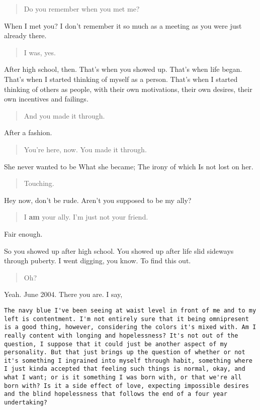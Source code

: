 \begin{quote}
Do you remember when you met me?
\end{quote}

When I met you? I don't remember it so much as a meeting as you were just already there.

\begin{quote}
I was, yes.
\end{quote}

After high school, then. That's when you showed up. That's when life began. That's when I started thinking of myself as a person. That's when I started thinking of others as people, with their own motivations, their own desires, their own incentives and failings.

\begin{quote}
And you made it through.
\end{quote}

After a fashion.

\begin{quote}
You're here, now. You made it through.
\end{quote}

She never wanted to be What she became; The irony of which Is not lost on her.

\begin{quote}
Touching.
\end{quote}

Hey now, don't be rude. Aren't you supposed to be my ally?

\begin{quote}
I \textbf{am} your ally. I'm just not your friend.
\end{quote}

Fair enough.

So you showed up after high school. You showed up after life slid sideways through puberty. I went digging, you know. To find this out.

\begin{quote}
Oh?
\end{quote}

Yeah. June 2004. There you are. I say,

\begin{verbatim}
The navy blue I've been seeing at waist level in front of me and to my left is contentment. I'm not entirely sure that it being omnipresent is a good thing, however, considering the colors it's mixed with. Am I really content with longing and hopelessness? It's not out of the question, I suppose that it could just be another aspect of my personality. But that just brings up the question of whether or not it's something I ingrained into myself through habit, something where I just kinda accepted that feeling such things is normal, okay, and what I want; or is it something I was born with, or that we're all born with? Is it a side effect of love, expecting impossible desires and the blind hopelessness that follows the end of a four year undertaking?
\end{verbatim}

